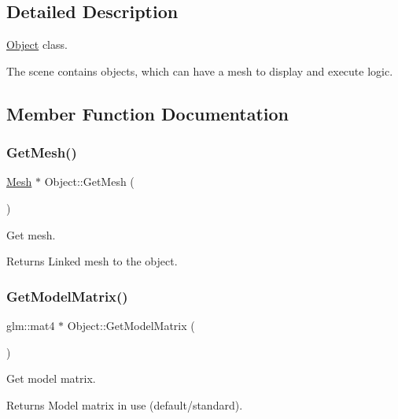\subsection{Detailed Description}
\hyperlink{class_object}{Object} class. 

The scene contains objects, which can have a mesh to display and execute logic. 

\subsection{Member Function Documentation}
\mbox{\label{class_object_ac59efbef5ea2a39576d7a057eb5e11ac}} 
\subsubsection{\texorpdfstring{Get\+Mesh()}{GetMesh()}}
{\footnotesize\ttfamily \hyperlink{class_mesh}{Mesh} $\ast$ Object\+::\+Get\+Mesh (\begin{DoxyParamCaption}{ }\end{DoxyParamCaption})}



Get mesh. 

\begin{DoxyReturn}{Returns}
Linked mesh to the object. 
\end{DoxyReturn}
\mbox{\label{class_object_a58e26d2cc568b514884336ed279dc00c}} 
\subsubsection{\texorpdfstring{Get\+Model\+Matrix()}{GetModelMatrix()}}
{\footnotesize\ttfamily glm\+::mat4 $\ast$ Object\+::\+Get\+Model\+Matrix (\begin{DoxyParamCaption}{ }\end{DoxyParamCaption})}



Get model matrix. 

\begin{DoxyReturn}{Returns}
Model matrix in use (default/standard). 
\end{DoxyReturn}
\mbox{\label{class_object_a6f86d9e3b77d79cc3a6a4d57a5c9ed72}} 
